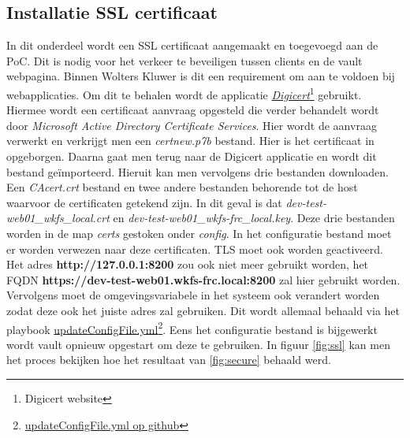 \subsection{Installatie SSL certificaat}
In dit onderdeel wordt een SSL certificaat aangemaakt en toegevoegd aan de PoC. Dit is nodig voor het verkeer te beveiligen tussen clients en de vault webpagina. Binnen Wolters Kluwer is dit een requirement om aan te voldoen bij webapplicaties. Om dit te behalen wordt de applicatie \href{https://www.digicert.com/}{\textit{Digicert}\footnote{\href{https://www.digicert.com/}{Digicert website}}} gebruikt. Hiermee wordt een certificaat aanvraag opgesteld die verder behandelt wordt door \textit{Microsoft Active Directory Certificate Services}. Hier wordt de aanvraag verwerkt en verkrijgt men een \textit{certnew.p7b} bestand. Hier is het certificaat in opgeborgen. Daarna gaat men terug naar de Digicert applicatie en wordt dit bestand geïmporteerd. Hieruit kan men vervolgens drie bestanden downloaden. Een \textit{CAcert.crt} bestand en twee andere bestanden behorende tot de host waarvoor de certificaten getekend zijn. In dit geval is dat \textit{dev-test-web01\_wkfs\_local.crt} en \textit{dev-test-web01\_wkfs-frc\_local.key}. Deze drie bestanden worden in de map \textit{certs} gestoken onder \textit{config}. In het configuratie bestand moet er worden verwezen naar deze certificaten. TLS moet ook worden geactiveerd. Het adres \textbf{http://127.0.0.1:8200} zou ook niet meer gebruikt worden, het FQDN \textbf{https://dev-test-web01.wkfs-frc.local:8200} zal hier gebruikt worden. Vervolgens moet de omgevingsvariabele in het systeem ook verandert worden zodat deze ook het juiste adres zal gebruiken. Dit wordt allemaal behaald via het playbook \href{https://github.com/Rayenasr/Secrets-management-thesis/blob/main/vault/updateConfigFile.yml}{updateConfigFile.yml}\footnote{\href{https://github.com/Rayenasr/Secrets-management-thesis/blob/main/vault/updateConfigFile.yml}{updateConfigFile.yml op github}}. Eens het configuratie bestand is bijgewerkt wordt vault opnieuw opgestart om deze te gebruiken. In figuur \ref{fig:ssl} kan men het proces bekijken hoe het resultaat van \ref{fig:secure} behaald werd. 


